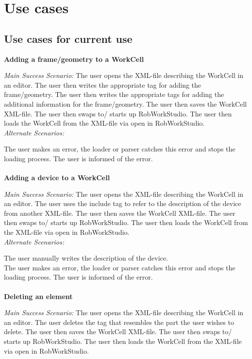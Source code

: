 \section{Use cases}
\label{app:useCases}
\subsection{Use cases for current use}
\textbf{Adding a frame/geometry to a WorkCell}

\noindent\textit{Main Success Scenario:} The user opens the XML-file describing the WorkCell in an editor. The user then writes the appropriate tag for adding the frame/geometry. The user then writes the appropriate tags for adding the additional information for the frame/geometry. The user then saves the WorkCell XML-file. The user then swaps to/ starts up RobWorkStudio. The user then loads the WorkCell from the XML-file via open in RobWorkStudio.\\

\noindent\textit{Alternate Scenarios:}

\noindent The user makes an error, the loader or parser catches this error and stops the loading process. The user is informed of the error.\\
\\

\noindent\textbf{Adding a device to a WorkCell}

\noindent\textit{Main Success Scenario:} The user opens the XML-file describing the WorkCell in an editor. The user uses the include tag to refer to the description of the device from another XML-file. The user then saves the WorkCell XML-file. The user then swaps to/ starts up RobWorkStudio. The user then loads the WorkCell from the XML-file via open in RobWorkStudio.\\

\noindent\textit{Alternate Scenarios:} 

\noindent The user manually writes the description of the device.\\

\noindent The user makes an error, the loader or parser catches this error and stops the loading process. The user is informed of the error. \\
\\

\noindent\textbf{Deleting an element}

\noindent\textit{Main Success Scenario:} The user opens the XML-file describing the WorkCell in an editor. The user deletes the tag that resembles the part the user wishes to delete. The user then saves the WorkCell XML-file. The user then swaps to/ starts up RobWorkStudio. The user then loads the WorkCell from the XML-file via open in RobWorkStudio.\\

